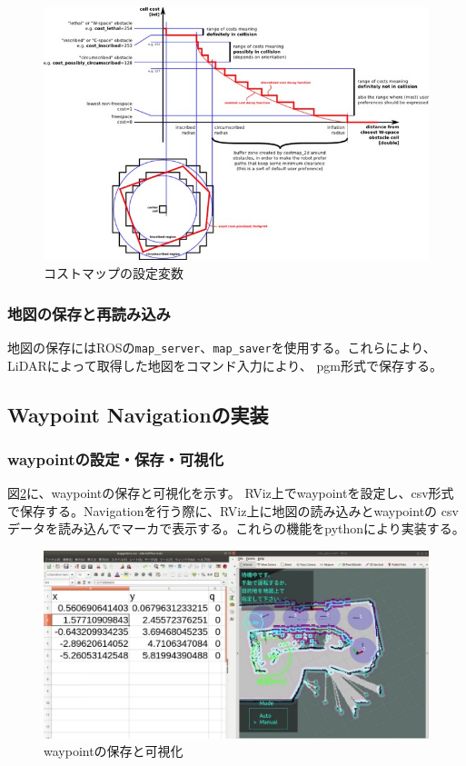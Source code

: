 \begin{enumerate}
\begin{enumerate}
    \begin{figure}[h]
      \begin{center}
        \includegraphics[width=.8\linewidth]{img/auto_41.jpg}
        \caption{コストマップの設定変数}
        \label{auto:costmap_2D}
      \end{center}
    \end{figure}
  \end{enumerate}
\end{enumerate}

\subsubsection{地図の保存と再読み込み}
地図の保存にはROSの\verb|map_server|、\verb|map_saver|を使用する。これらにより、LiDARによって取得した地図をコマンド入力により、
pgm形式で保存する。

\subsection{Waypoint Navigationの実装}
\subsubsection{waypointの設定・保存・可視化}
図\ref{auto:csv_waypoint}に、waypointの保存と可視化を示す。
RViz上でwaypointを設定し、csv形式で保存する。Navigationを行う際に、RViz上に地図の読み込みとwaypointの
csvデータを読み込んでマーカで表示する。これらの機能をpythonにより実装する。

\begin{figure}[h]
  \begin{center}
    \includegraphics[width=.8\linewidth]{img/auto_42.jpg}
    \caption{waypointの保存と可視化}
    \label{auto:csv_waypoint}
  \end{center}
\end{figure}

